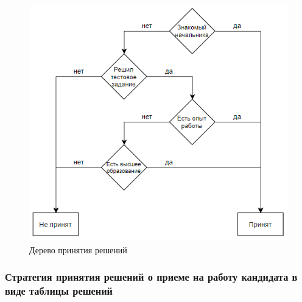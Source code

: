 \documentclass[14pt,a4paper,report]{report}
\begin{document}
\begin{figure}[h!]
	\centering
	\includegraphics[scale = 0.80]{images/tree.png}
	\caption{Дерево принятия решений}
	\label{image:2}
\end{figure}

\clearpage

\subsubsection{Стратегия принятия решений о приеме на работу кандидата в виде таблицы решений}
\end{document}
